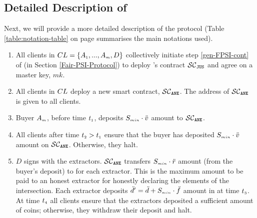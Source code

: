  \vspace{-4mm}
\subsection{Detailed Description of \epsi} 
 \vspace{-2.59mm}

Next, we will provide a more detailed description of the protocol (Table \ref{table:notation-table} on page \pageref{table:notation-table} summarises the main notations used). 


\vspace{-2.76mm}
\begin{enumerate}[leftmargin=4mm]


\item\label{e-psi::call-F-PSI-stepOne}  All clients in ${CL}=\{ A_{\scriptscriptstyle 1},...,   A_{\scriptscriptstyle m},  D\}$ collectively initiate step \ref{gen-FPSI-cont} of \fpsi (in Section \ref{Fair-PSI-Protocol}) to deploy \fpsi's contract $\mathcal{SC}_{\mathtt{JUS}}$ and agree on a  master key, $mk$. 

\item\label{e-psi::deploy-SC-E-PSI} All clients in ${CL}$  deploy a new smart contract, $\mathcal{SC}_{\mathtt{ANE}}$. The address of $\mathcal{SC}_{\mathtt{ANE}}$ is given to all clients. 

\item Buyer $ { A}_{\scriptscriptstyle {  m}}$, before time $t_{\scriptscriptstyle 1}$, deposits $S_{\scriptscriptstyle min}\cdot \ddot{v}$  amount to $\mathcal{SC}_{\mathtt{ANE}}$. 
\item\label{e-PSI::buyer-deposit} All clients after  time $t_{\scriptscriptstyle 2}>t_{\scriptscriptstyle 1}$ ensure that the buyer has deposited $S_{\scriptscriptstyle min}\cdot \ddot{v}$ amount on $\mathcal{SC}_{\mathtt{ANE}}$. Otherwise, they halt.



\item\label{e-PSI::extractor-deposit} $D$ signs \SCpc with the extractors. $\mathcal{SC}_{\mathtt{ANE}}$ transfers $S_{\scriptscriptstyle min}\cdot \ddot{r}$ amount (from the buyer's deposit) to \SCpc for each extractor. This is the maximum amount to be paid to an honest extractor for honestly declaring the elements of the intersection. %
%
Each extractor  deposits $\ddot{d}'=\ddot{d}+S_{\scriptscriptstyle min}\cdot \ddot{f}$ amount in \SCpc at time $t_{\scriptscriptstyle 3}$. At time $t_{\scriptscriptstyle 4}$ all clients ensure that the extractors deposited a sufficient amount of coins; otherwise, they withdraw their deposit and halt. 


\end{enumerate}
